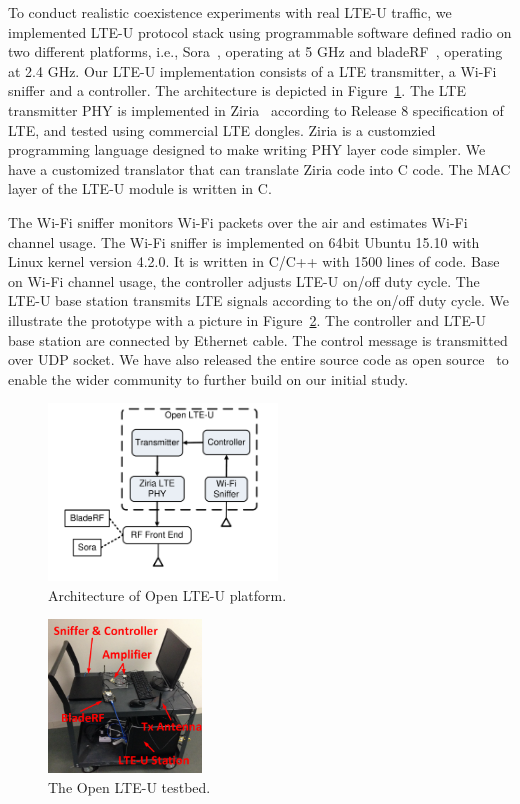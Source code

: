 
To conduct realistic coexistence experiments with real LTE-U traffic, 
we implemented LTE-U protocol stack 
using programmable software defined radio on two different platforms, 
i.e., Sora~\cite{sora}, operating at 5 GHz and bladeRF~\cite{bladeRF}, operating at 2.4 GHz. 
Our LTE-U implementation consists of a LTE transmitter, a Wi-Fi sniffer and a controller.
The architecture is depicted in Figure~\ref{fig:platform}.
The LTE transmitter PHY is implemented in Ziria~\cite{stewart2015ziria} according to Release 8 specification of LTE, and tested using commercial LTE dongles. 
Ziria is a customzied programming language designed
to make writing PHY layer code simpler.  
We have a customized translator that 
can translate Ziria code into C code.
The MAC layer of the LTE-U module is written in C. 


The Wi-Fi sniffer monitors Wi-Fi packets over the air and estimates Wi-Fi channel usage.
The Wi-Fi sniffer is implemented on 64bit Ubuntu 15.10
with Linux kernel version 4.2.0. 
It is written in C/C++ with 1500 lines of code. 
Base on Wi-Fi channel usage, the controller adjusts LTE-U on/off duty cycle. 
The LTE-U base station transmits LTE signals according to the on/off duty cycle. 
We illustrate the prototype with a picture in Figure~\ref{fig:testbed}.
The controller and LTE-U base station are connected by
Ethernet cable. 
The control message is transmitted over UDP socket. 
We have also released the entire source code as open source~\cite{OpenLTEU} to enable the wider community to further build on our initial study.



\begin{figure}[!htb]
 \centering
     \includegraphics[width=2.4in]{./figures/architecture}
     \vspace{0.0cm}
     \caption{Architecture of Open LTE-U platform.}
   \label{fig:platform}
\end{figure}

\begin{figure}[!htb]
 \centering
     \includegraphics[width=1.6in]{./figures/testbed.png}
  \caption{The Open LTE-U testbed.}
   \label{fig:testbed}
\end{figure}



